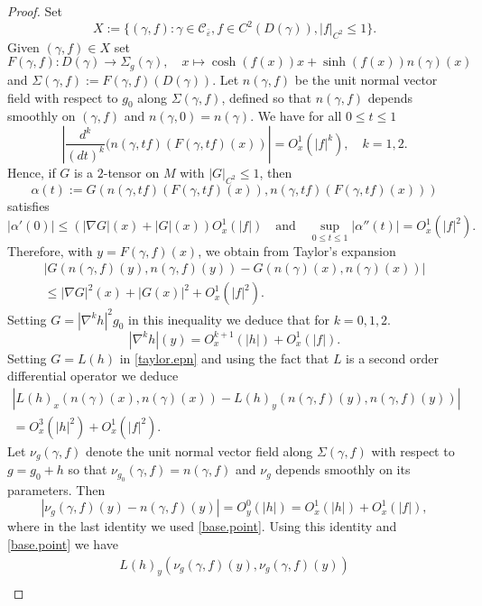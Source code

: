 \documentclass[11pt]{amsart}
\theoremstyle{remark}
\theoremstyle{definition}
\begin{document}
{{	\begin{proof}
		Set $$X:=\{(\gamma,f):\gamma\in\mathcal C_{\bar \varepsilon}, f\in C^2(D(\gamma)), |f|_{C^2}\leq 1\}.$$
		Given $(\gamma,f)\in X$ set
		\begin{equation*}
			F(\gamma,f): D(\gamma)\rightarrow \Sigma_{g}(\gamma),\quad x\mapsto \cosh(f(x))x+\sinh(f(x))n(\gamma)(x)
		\end{equation*}
		and $\Sigma(\gamma,f):=F(\gamma,f)(D(\gamma))$. Let $n(\gamma,f)$ be the unit normal vector field with respect to $g_0$ along $\Sigma(\gamma,f)$, defined so that $n(\gamma,f)$ depends smoothly on $(\gamma,f)$ and $n(\gamma,0)=n(\gamma)$.
		We have for all $0\leq t\leq 1$
		$$\left|\frac{d^k}{(dt)^k}(n(\gamma,tf)(F(\gamma,tf)(x))\right|=O_x^1(|f|^k), \quad k=1,2.$$
		Hence, if $G$ is a $2$-tensor on $M$ with $|G|_{C^2}\leq 1$, then
		$$\alpha(t):=G(n(\gamma,tf)(F(\gamma,tf)(x)),n(\gamma,tf)(F(\gamma,tf)(x)))$$
		satisfies 
		$$|\alpha'(0)|\leq (|\nabla G|(x)+|G|(x))O_x^1(|f|)\quad\mbox{and}\quad \sup_{0\leq t\leq 1}|\alpha''(t)|=O_x^1(|f|^2).$$
		Therefore, with $y=F(\gamma,f)(x)$, we obtain from Taylor's expansion
		\begin{multline}\label{taylor.epn}
			|G(n(\gamma,f)(y),n(\gamma,f)(y))-G(n(\gamma)(x),n(\gamma)(x))|\\
			\leq |\nabla G|^2(x)+|G(x)|^2+O_x^1(|f|^2).
		\end{multline}
		Setting $G=|\nabla^k h|^2g_0$ in this inequality we deduce that for  $k=0,1,2.$
		\begin{equation}\label{base.point}
			|\nabla^k h|(y)=O^{k+1}_x(|h|)+O_x^1(|f|).
		\end{equation}
		Setting  $G=L(h)$ in \eqref{taylor.epn} and using the fact that $L$ is a second order differential operator we deduce
		\begin{multline}\label{expn.Lh}
			|L(h)_x(n(\gamma)(x),n(\gamma)(x))-L(h)_y(n(\gamma,f)(y),n(\gamma,f)(y))|\\
			=O_x^3(|h|^2)+ O_x^1(|f|^2).
		\end{multline}
		Let $\nu_g(\gamma,f)$ denote the unit normal vector field along $\Sigma(\gamma,f)$ with respect to $g=g_0+h$ so that $\nu_{g_0}(\gamma,f)=n(\gamma,f)$ and $\nu_g$ depends smoothly on its parameters. Then
		$$|\nu_g(\gamma,f)(y)-n(\gamma,f)(y)|=O_y^0(|h|)=O_x^1(|h|)+ O_x^1(|f|),$$
		where in the last identity we used \eqref{base.point}. Using this identity and \eqref{base.point}  we have
		\begin{multline*}
			L(h)_y(\nu_g(\gamma,f)(y),\nu_g(\gamma,f)(y))\\

\end{multline*}
\end{proof}}}
\end{document}
